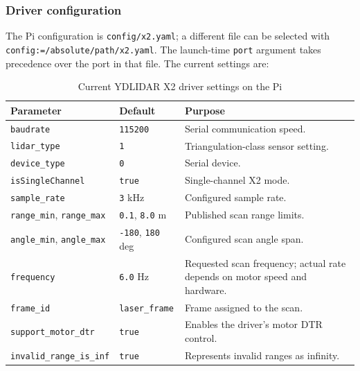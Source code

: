 \subsubsection{Driver configuration}
The Pi configuration is \texttt{config/x2.yaml}; a different file can be selected with \texttt{config:=/absolute/path/x2.yaml}. The launch-time \texttt{port} argument takes precedence over the port in that file. The current settings are:
\begin{table}[!htbp]
    \centering
    \small
    \renewcommand{\arraystretch}{1.2}
    \begin{tabular}{p{4.2cm}p{3.2cm}p{7.5cm}}
        \toprule
        \textbf{Parameter} & \textbf{Default} & \textbf{Purpose} \\
        \midrule
        \texttt{baudrate} & \texttt{115200} & Serial communication speed. \\
        \texttt{lidar\_type} & \texttt{1} & Triangulation-class sensor setting. \\
        \texttt{device\_type} & \texttt{0} & Serial device. \\
        \texttt{isSingleChannel} & \texttt{true} & Single-channel X2 mode. \\
        \texttt{sample\_rate} & \texttt{3} kHz & Configured sample rate. \\
        \texttt{range\_min}, \texttt{range\_max} & \texttt{0.1}, \texttt{8.0} m & Published scan range limits. \\
        \texttt{angle\_min}, \texttt{angle\_max} & \texttt{-180}, \texttt{180} deg & Configured scan angle span. \\
        \texttt{frequency} & \texttt{6.0} Hz & Requested scan frequency; actual rate depends on motor speed and hardware. \\
        \texttt{frame\_id} & \texttt{laser\_frame} & Frame assigned to the scan. \\
        \texttt{support\_motor\_dtr} & \texttt{true} & Enables the driver's motor DTR control. \\
        \texttt{invalid\_range\_is\_inf} & \texttt{true} & Represents invalid ranges as infinity. \\
        \bottomrule
    \end{tabular}
    \caption{Current YDLIDAR X2 driver settings on the Pi}
\end{table}

